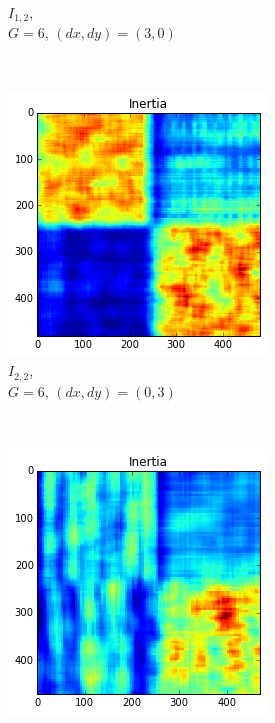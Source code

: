 \documentclass[a4paper]{article}
\begin{document}
\begin{figure}
\begin{subfigure}[b]{0.30\textwidth}
        \caption{%
            $I_{1,2}$, \\
            $G=6$, $(dx, dy)=(3,0)$
        }
        \label{fig:i12}
    \end{subfigure}
    ~
    \begin{subfigure}[b]{0.30\textwidth}
        \centering
        \includegraphics[width=\textwidth]{inertia22.png}
        \caption{%
            $I_{2,2}$, \\
            $G=6$, $(dx, dy)=(0,3)$
        }
        \label{fig:i22}
    \end{subfigure}
    ~
    \begin{subfigure}[b]{0.30\textwidth}
        \centering
        \includegraphics[width=\textwidth]{inertia32.png}

\end{subfigure}
\end{figure}
\end{document}
